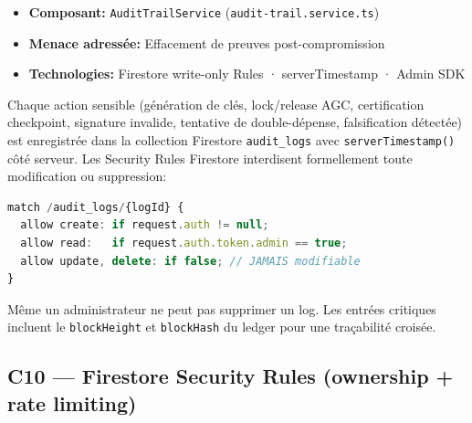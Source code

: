 \documentclass[12pt,a4paper]{report}
\begin{document}
\begin{tcolorbox}[definbox,title={Couche C9 --- Audit Trail immuable}]
  \begin{itemize}[itemsep=5pt]
    \item \textbf{Composant:} \texttt{AuditTrailService} (\texttt{audit-trail.service.ts})
    \item \textbf{Menace adressée:} Effacement de preuves post-compromission
    \item \textbf{Technologies:} Firestore write-only Rules · serverTimestamp · Admin SDK
  \end{itemize}
  \vspace{0.3cm}
  Chaque action sensible (génération de clés, lock/release AGC, certification checkpoint,
  signature invalide, tentative de double-dépense, falsification détectée) est enregistrée
  dans la collection Firestore \texttt{audit\_logs} avec \texttt{serverTimestamp()} côté
  serveur. Les Security Rules Firestore interdisent formellement toute modification ou
  suppression:
  \begin{lstlisting}[basicstyle=\footnotesize\ttfamily,language=Typescript]
match /audit_logs/{logId} {
  allow create: if request.auth != null;
  allow read:   if request.auth.token.admin == true;
  allow update, delete: if false; // JAMAIS modifiable
}
\end{lstlisting}
  Même un administrateur ne peut pas supprimer un log. Les entrées critiques
  incluent le \texttt{blockHeight} et \texttt{blockHash} du ledger pour une
  traçabilité croisée.
\end{tcolorbox}

\vspace{0.3cm}

\subsection{C10 — Firestore Security Rules (ownership + rate limiting)}
\end{document}
